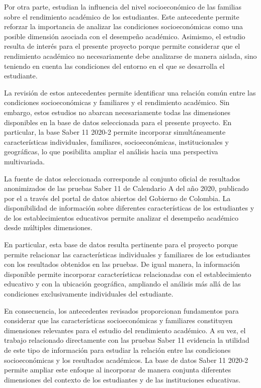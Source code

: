 \documentclass[12pt]{article}
\begin{document}
Por otra parte, \textcite{morales2024} estudian la influencia del nivel socioeconómico de las familias sobre el rendimiento académico de los estudiantes. Este antecedente permite reforzar la importancia de analizar las condiciones socioeconómicas como una posible dimensión asociada con el desempeño académico. Asimismo, el estudio resulta de interés para el presente proyecto porque permite considerar que el rendimiento académico no necesariamente debe analizarse de manera aislada, sino teniendo en cuenta las condiciones del entorno en el que se desarrolla el estudiante.

La revisión de estos antecedentes permite identificar una relación común entre las condiciones socioeconómicas y familiares y el rendimiento académico. Sin embargo, estos estudios no abarcan necesariamente todas las dimensiones disponibles en la base de datos seleccionada para el presente proyecto. En particular, la base Saber 11 2020-2 permite incorporar simultáneamente características individuales, familiares, socioeconómicas, institucionales y geográficas, lo que posibilita ampliar el análisis hacia una perspectiva multivariada.

La fuente de datos seleccionada corresponde al conjunto oficial de resultados anonimizados de las pruebas Saber 11 de Calendario A del año 2020, publicado por el \textcite{icfes2026} a través del portal de datos abiertos del Gobierno de Colombia. La disponibilidad de información sobre diferentes características de los estudiantes y de los establecimientos educativos permite analizar el desempeño académico desde múltiples dimensiones.

En particular, esta base de datos resulta pertinente para el proyecto porque permite relacionar las características individuales y familiares de los estudiantes con los resultados obtenidos en las pruebas. De igual manera, la información disponible permite incorporar características relacionadas con el establecimiento educativo y con la ubicación geográfica, ampliando el análisis más allá de las condiciones exclusivamente individuales del estudiante.

En consecuencia, los antecedentes revisados proporcionan fundamentos para considerar que las características socioeconómicas y familiares constituyen dimensiones relevantes para el estudio del rendimiento académico. A su vez, el trabajo relacionado directamente con las pruebas Saber 11 evidencia la utilidad de este tipo de información para estudiar la relación entre las condiciones socioeconómicas y los resultados académicos. La base de datos Saber 11 2020-2 permite ampliar este enfoque al incorporar de manera conjunta diferentes dimensiones del contexto de los estudiantes y de las instituciones educativas.
\end{document}
